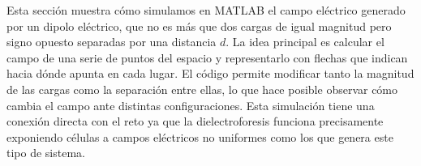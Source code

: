 \tab Esta sección muestra cómo simulamos en MATLAB el campo eléctrico generado por un dipolo eléctrico, que no es más que dos cargas de igual magnitud pero signo opuesto separadas por una distancia $d$. La idea principal es calcular el campo de una serie de puntos del espacio y representarlo con flechas que indican hacia dónde apunta en cada lugar. El código permite modificar tanto la magnitud de las cargas como la separación entre ellas, lo que hace posible observar cómo cambia el campo ante distintas configuraciones. Esta simulación tiene una conexión directa con el reto ya que la dielectroforesis funciona precisamente exponiendo células a campos eléctricos no uniformes como los que genera este tipo de sistema.